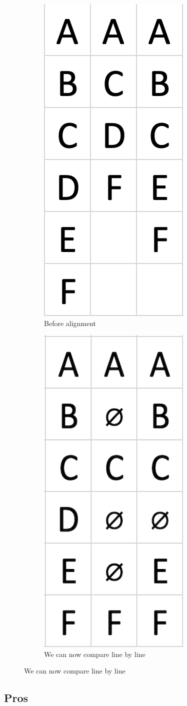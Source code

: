 \documentclass[11pt]{article}
\begin{document}
\begin{figure}[h!]
  \centering
  \begin{subfigure}[b]{0.4\linewidth}
  \centering
    \includegraphics[width=0.3\linewidth]{img/tobealigned.png}
    \caption{Before alignment}
  \end{subfigure}
  \begin{subfigure}[b]{0.4\linewidth}
  \centering
    \includegraphics[width=0.3\linewidth]{img/aligned.png}
    \caption{We can now compare line by line}
  \end{subfigure}
\end{figure}

\subsection{Pros}
\end{document}
